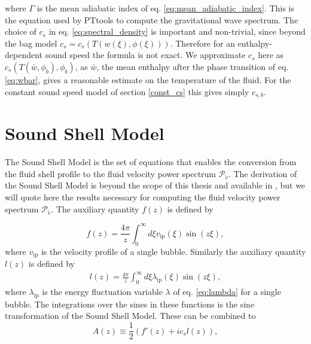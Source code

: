 where $\Gamma$ is the mean adiabatic index of eq. \eqref{eq:mean_adiabatic_index}.
This is the equation used by PTtools to compute the gravitational wave spectrum.
The choice of $c_s$ in eq. \eqref{eq:spectral_density} is important and non-trivial,
since beyond the bag model $c_s = c_s(T(w(\xi),\phi(\xi)))$.
Therefore for an enthalpy-dependent sound speed the formula is not exact.
We approximate $c_s$ here as $c_s(T(\bar{w},\phi_b),\phi_b)$,
as $\bar{w}$, the mean enthalpy after the phase transition of eq. \eqref{eq:wbar},
gives a reasonable estimate on the temperature of the fluid.
For the constant sound speed model of section \ref{const_cs} this gives simply $c_{s,b}$.


\section{Sound Shell Model}
\label{sound_shell_model}
The Sound Shell Model is the set of equations that enables the conversion from the fluid shell profile to the fluid velocity power spectrum $\mathcal{P}_\tilde{v}$.
The derivation of the Sound Shell Model is beyond the scope of this thesis and available in \cite{hindmarsh_gw_pt_2019},
but we will quote here the results necessary for computing the fluid velocity power spectrum $\mathcal{P}_\tilde{v}$.
The auxiliary quantity $f(z)$ is defined by
\cite[eq. 4.5]{hindmarsh_gw_pt_2019}
\iffalse
\begin{equation}
f(z) = \int d^3\xi \frac{1}{\xi} v_\text{ip}(\xi) e^{-iz^i \xi^i}
= \frac{4\pi}{z} \int_0^\infty d\xi v_\text{ip}(\xi) \sin(z\xi)
\end{equation}
\fi
\begin{equation}
f(z) = \frac{4\pi}{z} \int_0^\infty d\xi v_\text{ip}(\xi) \sin(z\xi),
\end{equation}
where $v_\text{ip}$ is the velocity profile of a single bubble.
Similarly the auxiliary quantity $l(z)$ is defined by
\cite[eq. 4.8]{hindmarsh_gw_pt_2019}
\begin{align}
l(z) = \frac{4 \pi}{z} \int_0^\infty d\xi \lambda_\text{ip}(\xi) \sin(z\xi),
\end{align}
where $\lambda_\text{ip}$ is the energy fluctuation variable $\lambda$ of eq. \eqref{eq:lambda} for a single bubble.
The integrations over the sines in these functions is the sine transformation of the Sound Shell Model.
These can be combined to
\cite[eq. 4.10]{hindmarsh_gw_pt_2019}
\begin{equation}
A(z) \equiv \frac{1}{2} \left( f'(z) + i c_s l(z) \right),
\end{equation}
